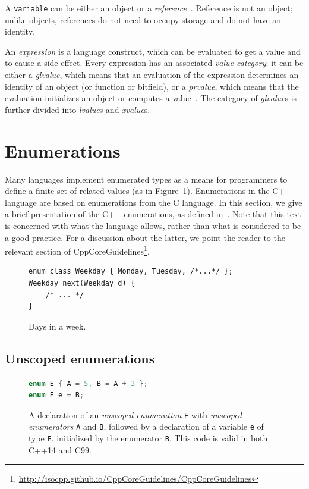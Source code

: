 \documentclass[nolot,nolof,nocover,printed]{fithesis3}
\newcommand{\stdN}[2]{\cite[#2]{#1}\xspace}
\begin{document}
A \texttt{variable} can be either an object or a \textit{reference}~\stdN{n4700}{\S 6/6}. Reference is not an object; unlike objects, references do not need to occupy storage and do not have an identity.

An \textit{expression} is a language construct, which can be evaluated to get a value and to cause a side-effect. Every expression has an associated \textit{value category}: it can be either a \textit{glvalue}, which means that an evaluation of the expression determines an identity of an object (or function or bitfield), or a \textit{prvalue}, which means that the evaluation initializes an object or computes a value~\stdN{n4700}{6.10/1}. The category of \textit{glvalue}s is further divided into \textit{lvalue}s and \textit{xvalue}s. 

\section{Enumerations}

Many languages implement enumerated types as a means for programmers to define a finite set of related values (as in Figure~\ref{fig:daysInWeek}). Enumerations in the C++ language are based on enumerations from the C language. In this section, we give a brief presentation of the C++ enumerations, as defined in~\cite{n4296}. Note that this text is concerned with what the language allows, rather than what is considered to be a good practice. For a discussion about the latter, we point the reader to the relevant section of CppCoreGuidelines\footnote{\url{http://isocpp.github.io/CppCoreGuidelines/CppCoreGuidelines}}. 

\begin{figure}[ht]
\begin{lstlisting}
enum class Weekday { Monday, Tuesday, /*...*/ };
Weekday next(Weekday d) {
    /* ... */
}
\end{lstlisting}
\caption{Days in a week.}
\label{fig:daysInWeek}
\end{figure}

\subsection{Unscoped enumerations}

\begin{figure}
\begin{lstlisting}[language=C++]
enum E { A = 5, B = A + 3 };
enum E e = B;
\end{lstlisting}
\caption{A declaration of an \textit{unscoped enumeration} \texttt{E} with \textit{unscoped enumerators} \texttt{A} and \texttt{B}, followed by a declaration of a variable \texttt{e} of type \texttt{E}, initialized by the enumerator \texttt{B}. This code is valid in both C++14 and C99.}
\label{CStyleEnumDeclaration}
\end{figure}
\end{document}
